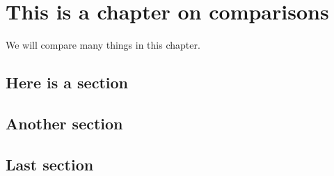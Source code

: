 \chapter{This is a chapter on comparisons}

We will compare many things in this chapter.

\section{Here is a section}

\section{Another section}

\section{Last section}
